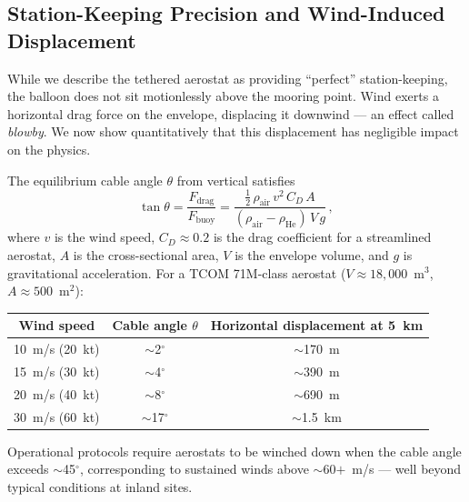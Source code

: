 \documentclass[11pt]{article}
\begin{document}
\subsection{Station-Keeping Precision and Wind-Induced Displacement}

While we describe the tethered aerostat as providing ``perfect''
station-keeping, the balloon does not sit motionlessly above the
mooring point.  Wind exerts a horizontal drag force on the envelope,
displacing it downwind --- an effect called \emph{blowby}.  We now
show quantitatively that this displacement has negligible impact on
the physics.

The equilibrium cable angle $\theta$ from vertical satisfies
\begin{equation}
  \tan\theta = \frac{F_{\text{drag}}}{F_{\text{buoy}}}
  = \frac{\tfrac{1}{2}\,\rho_{\text{air}}\,v^2\,C_D\,A}{
          (\rho_{\text{air}} - \rho_{\text{He}})\,V\,g}\,,
  \label{eq:blowby}
\end{equation}
where $v$ is the wind speed, $C_D \approx 0.2$ is the drag coefficient
for a streamlined aerostat, $A$ is the cross-sectional area, $V$ is the
envelope volume, and $g$ is gravitational acceleration.
For a TCOM 71M-class aerostat ($V \approx 18{,}000$~m$^3$,
$A \approx 500$~m$^2$):
\begin{center}
\begin{tabular}{ccc}
\toprule
\textbf{Wind speed} & \textbf{Cable angle $\theta$} &
\textbf{Horizontal displacement at 5~km} \\
\midrule
10~m/s (20~kt)  & $\sim$2$^\circ$  & $\sim$170~m \\
15~m/s (30~kt)  & $\sim$4$^\circ$  & $\sim$390~m \\
20~m/s (40~kt)  & $\sim$8$^\circ$  & $\sim$690~m \\
30~m/s (60~kt)  & $\sim$17$^\circ$ & $\sim$1.5~km \\
\bottomrule
\end{tabular}
\end{center}
Operational protocols require aerostats to be winched down when the
cable angle exceeds $\sim$45$^\circ$, corresponding to sustained
winds above $\sim$60$+$~m/s --- well beyond typical conditions at
inland sites.
\end{document}
